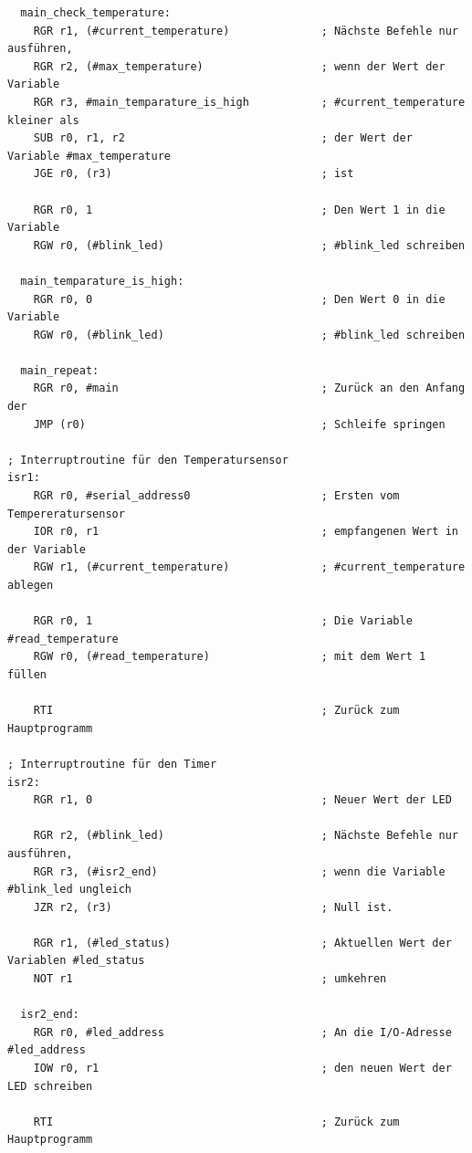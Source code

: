 {\begin{verbatim}
  main_check_temperature:
    RGR r1, (#current_temperature)              ; Nächste Befehle nur ausführen,
    RGR r2, (#max_temperature)                  ; wenn der Wert der Variable
    RGR r3, #main_temparature_is_high           ; #current_temperature kleiner als
    SUB r0, r1, r2                              ; der Wert der Variable #max_temperature
    JGE r0, (r3)                                ; ist

    RGR r0, 1                                   ; Den Wert 1 in die Variable
    RGW r0, (#blink_led)                        ; #blink_led schreiben

  main_temparature_is_high:
    RGR r0, 0                                   ; Den Wert 0 in die Variable
    RGW r0, (#blink_led)                        ; #blink_led schreiben

  main_repeat:
    RGR r0, #main                               ; Zurück an den Anfang der
    JMP (r0)                                    ; Schleife springen

; Interruptroutine für den Temperatursensor
isr1:
    RGR r0, #serial_address0                    ; Ersten vom Tempereratursensor
    IOR r0, r1                                  ; empfangenen Wert in der Variable
    RGW r1, (#current_temperature)              ; #current_temperature ablegen

    RGR r0, 1                                   ; Die Variable #read_temperature
    RGW r0, (#read_temperature)                 ; mit dem Wert 1 füllen

    RTI                                         ; Zurück zum Hauptprogramm

; Interruptroutine für den Timer
isr2:
    RGR r1, 0                                   ; Neuer Wert der LED

    RGR r2, (#blink_led)                        ; Nächste Befehle nur ausführen,
    RGR r3, (#isr2_end)                         ; wenn die Variable #blink_led ungleich
    JZR r2, (r3)                                ; Null ist.

    RGR r1, (#led_status)                       ; Aktuellen Wert der Variablen #led_status
    NOT r1                                      ; umkehren

  isr2_end:
    RGR r0, #led_address                        ; An die I/O-Adresse #led_address
    IOW r0, r1                                  ; den neuen Wert der LED schreiben

    RTI                                         ; Zurück zum Hauptprogramm
\end{verbatim}
}
